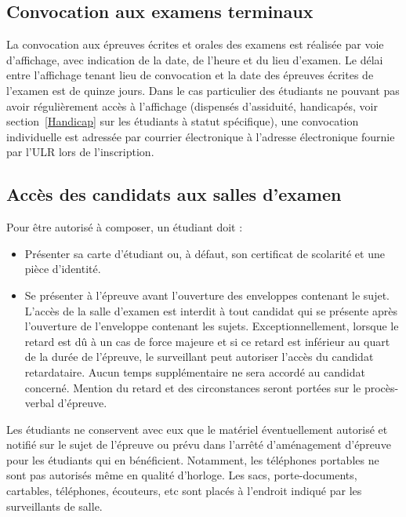 \documentclass[a4paper,11pt]{article}
\begin{document}
\subsection{Convocation aux examens terminaux}\label{exam}
La convocation aux épreuves écrites et orales des examens est réalisée par voie d'affichage, avec indication de la date, de l'heure et du lieu d'examen. Le délai entre l'affichage tenant lieu de convocation et la date des épreuves écrites de l'examen est de quinze jours.
Dans le cas particulier des étudiants ne pouvant pas avoir régulièrement accès à l'affichage (dispensés d'assiduité, handicapés, voir section~\ref{Handicap} sur les étudiants à statut spécifique), une convocation individuelle est adressée par courrier électronique à l'adresse électronique fournie par l'ULR lors de l'inscription.

\subsection{Accès des candidats aux salles d'examen}
Pour être autorisé à composer, un étudiant doit :
\begin{itemize}
	\item Présenter sa carte d'étudiant ou, à défaut, son certificat de scolarité et une pièce d'identité.
	\item Se présenter à l'épreuve avant l'ouverture des enveloppes contenant le sujet. L'accès de la salle d'examen est interdit à tout candidat qui se présente après l'ouverture de l'enveloppe contenant les sujets. Exceptionnellement, lorsque le retard est dû à un cas de force majeure et si ce retard est inférieur au quart de la durée de l'épreuve, le surveillant peut autoriser l'accès du candidat retardataire. Aucun temps supplémentaire ne sera accordé au candidat concerné. Mention du retard et des circonstances seront portées sur le procès-verbal d'épreuve.
\end{itemize}

Les étudiants ne conservent avec eux que le matériel éventuellement autorisé et notifié sur le sujet de l'épreuve ou prévu dans l'arrêté d'aménagement d'épreuve pour les étudiants qui en bénéficient. Notamment, les téléphones portables ne sont pas autorisés même en qualité d'horloge. Les sacs, porte-documents, cartables, téléphones, écouteurs, etc sont placés à l'endroit indiqué par les surveillants de salle.
\end{document}
